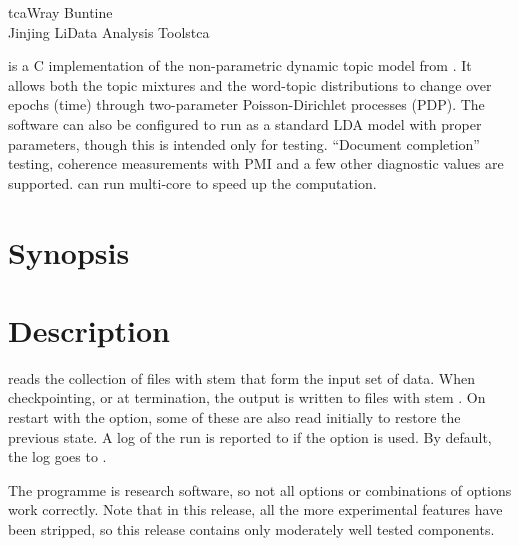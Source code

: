 \documentclass[a4paper,english]{article}
\begin{document}
\begin{Name}{1}{tca}{Wray Buntine \\ Jinjing Li}{Data Analysis Tools}{tca}

   is a C implementation of the non-parametric dynamic topic model from \citet{dtmpypwl}. It allows both the topic mixtures and the word-topic distributions to change over epochs (time) through two-parameter Poisson-Dirichlet processes (PDP). The software can also be configured to run as a standard LDA model with proper parameters, though this is intended only for testing. ``Document completion'' testing, coherence measurements with PMI  and a few other diagnostic values are supported.   can run multi-core to speed up the computation.

\end{Name}

\section{Synopsis}

  
                  

\section{Description}
 reads the collection of files with stem
 that form the input set of data.
When checkpointing, or at termination, the output is written
to files with stem  .
On restart with the  option, some of these
are also read initially to restore the previous state.
A log of the run is reported to  if the
 option is used.  By default, the log goes to
.

The programme is research software, so not all options
or combinations of options work correctly.
Note that in this release, all the more experimental features
have been stripped, so this release contains
only moderately well tested components.
\end{document}
